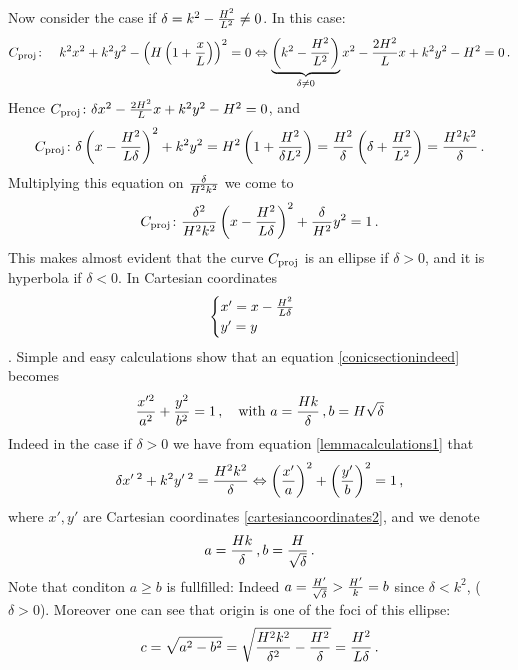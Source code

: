 \documentclass[12pt]{article}
\numberwithin{equation}{section}
\begin{document}
Now consider the case if $\delta=k^2-{H^2\over L^2}\not=0$. 
In this case:
  \begin{equation*}
C_{\rm proj}\colon\quad k^2x^2+k^2y^2-
   \left(H\left(1+{x\over L}\right)\right)^2=0\Leftrightarrow
   \underbrace{\left(k^2-{H^2\over L^2}\right)}_{\delta\not=0}
         x^2-{2H^2\over L}x+k^2y^2-H^2=0\,.
           \end{equation*}
Hence $C_{\rm proj}\colon 
\delta x^2-{2H^2\over L}x+k^2y^2-H^2=0$, and  
         \begin{equation}\label{lemmacalculations1}
C_{\rm proj}\colon 
  \delta\left(x-{H^2\over L\delta}\right)^2+k^2y^2=
    H^2\left(1+{H^2\over \delta L^2}\right)=
    {H^2\over \delta}
 \left(\delta+{H^2\over  L^2}\right)=
      {H^2k^2\over\delta}\,.
           \end{equation}
Multiplying this equation on ${\delta\over H^2k^2}$ we come to
          \begin{equation}\label{conicsectionindeed}
C_{\rm proj}\colon 
  {\delta^2\over H^2k^2}\left(x-{H^2\over L\delta}\right)^2+
    {\delta\over H^2}y^2=
      1\,.
          \end{equation}
This makes almost evident that the curve $C_{\rm proj}$
is an ellipse if $\delta>0$, and it is hyperbola if $\delta<0$.
In Cartesian coordinates 
       \begin{equation}\label{cartesiancoordinates2}
        \begin{cases}x'=x-{H^2\over L\delta}\cr y'=y\cr
     \end{cases}
         \end{equation}.
Simple and easy calculations show that
an  equation \eqref{conicsectionindeed} becomes
                \begin{equation*}
 {x'^2\over a^2}+{y^2\over b^2}=1\,,\quad {\rm with}\,\,
   a={Hk\over \delta}\,, b={H\sqrt \delta}
    \end{equation*}
Indeed in the case if $\delta>0$ we have from
equation \eqref{lemmacalculations1} that
              \begin{equation*}
  \delta x'\,^2+k^2y'\,^2={H^2k^2\over\delta}
          \Leftrightarrow
    \left({x'\over a}\right)^2+\left({y'\over b}\right)^2=1\,, 
              \end{equation*} 
where $x',y'$ are Cartesian coordinates
\eqref{cartesiancoordinates2}, and
we denote
           \begin{equation}\label{notations4}
          a={Hk\over \delta}\,,b={H\over \sqrt \delta}\,.
            \end{equation}
Note that conditon $a\geq b$ is fullfilled:
Indeed
$a={H'\over \sqrt \delta}>{H'\over k }=b$
since $\delta<k^2$, ($\delta>0$). Moreover
one can see that origin is one of the foci of this ellipse:
      \begin{equation}\label{originisfocus}
   c=\sqrt{a^2-b^2}=
  \sqrt{{H^2k^2\over \delta^2}-{H^2\over\delta}}=
{H^2\over L\delta}\,.   
        \end{equation}
 
\end{document}
